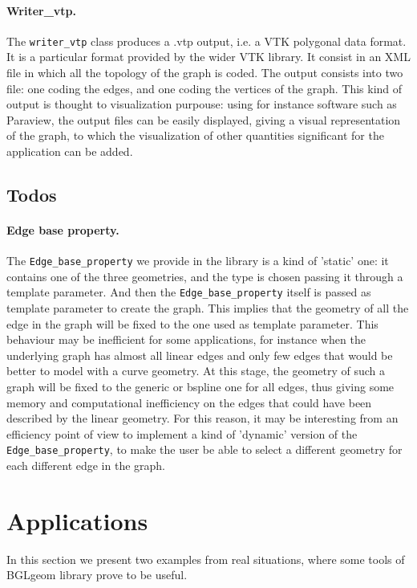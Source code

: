 \documentclass[11pt]{article} %
\newcommand{\classname}[1]{\texttt{#1}}
\begin{document}
		\paragraph{Writer\_vtp.} The \texttt{writer\_vtp} class produces a .vtp output, i.e. a VTK polygonal data format. It is a particular format provided by the wider VTK library. It consist in an XML file in which all the topology of the graph is coded. The output consists into two file: one coding the edges, and one coding the vertices of the graph. This kind of output is thought to visualization purpouse: using for instance software such as Paraview, the output files can be easily displayed, giving a visual representation of the graph, to which the visualization of other quantities significant for the application can be added.
	
	\subsection{Todos}	%
		\paragraph{Edge base property.} The \classname{Edge\_base\_property} we provide in the library is a kind of 'static' one: it contains one of the three geometries, and the type is chosen passing it through a template parameter. And then the \classname{Edge\_base\_property} itself is passed as template parameter to create the graph. This implies that the geometry of all the edge in the graph will be fixed to the one used as template parameter. This behaviour may be inefficient for some applications, for instance when the underlying graph has almost all linear edges and only few edges that would be better to model with a curve geometry. At this stage, the geometry of such a graph will be fixed to the generic or bspline one for all edges, thus giving some memory and computational inefficiency on the edges that could have been described by the linear geometry. For this reason, it may be interesting from an efficiency point of view to implement a kind of 'dynamic' version of the \classname{Edge\_base\_property}, to make the user be able to select a different geometry for each different edge in the graph.

\section{Applications}

	In this section we present two examples from real situations, where some tools of BGLgeom library prove to be useful.
\end{document}
